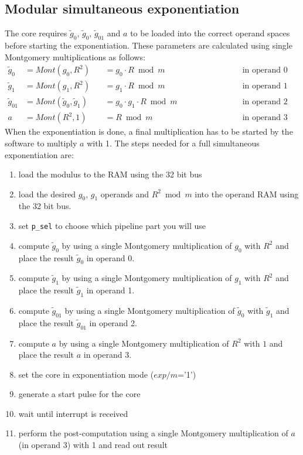 \subsection{Modular simultaneous exponentiation}
The core requires $\tilde{g}_{0}$, $\tilde{g}_{0}$, $\tilde{g}_{01}$ and $a$ to be loaded into the correct operand
spaces before starting the exponentiation. These parameters are calculated using single Montgomery multiplications as follows:
\begin{align*}
	\tilde{g}_{0} &= Mont(g_{0}, R^{2}) &\,&= g_{0} \cdot R \bmod m & \hspace{3cm}\text{in operand 0}\hspace{4cm}\\
	\tilde{g}_{1} &= Mont(g_{1}, R^{2}) &\,&= g_{1} \cdot R \bmod m & \hspace{3cm}\text{in operand 1}\hspace{4cm}\\
	\tilde{g}_{01} &= Mont(\tilde{g}_{0}, \tilde{g}_{1}) &\,&= g_{0} \cdot g_{1} \cdot R \bmod m & \hspace{3cm}\text{in operand 2}\hspace{4cm}\\
	a &= Mont(R^{2}, 1) &\,&= R \bmod m &\hspace{3cm}\text{in operand 3}\hspace{4cm}
\end{align*}
When the exponentiation is done, a final multiplication has to be started by the software to multiply $a$ with 1.
The steps needed for a full simultaneous exponentiation are:


\begin{enumerate}
  	\item load the modulus to the RAM using the 32 bit bus
	\item load the desired $g_0$, $g_1$ operands and \(R^{2} \bmod m\) into the operand RAM using the 32 bit bus.
	\item set \verb|p_sel| to choose which pipeline part you will use
	\item compute $\tilde{g}_{0}$ by using a single Montgomery multiplication of $g_{0}$ with $R^{2}$ and place the result $\tilde{g}_{0}$ in operand 0.
	\item compute $\tilde{g}_{1}$ by using a single Montgomery multiplication of $g_{1}$ with $R^{2}$ and place the result $\tilde{g}_{1}$ in operand 1.
	\item compute $\tilde{g}_{01}$ by using a single Montgomery multiplication of $\tilde{g}_{0}$ with $\tilde{g}_{1}$ and place the result $\tilde{g}_{01}$ in operand 2.
	\item compute $a$ by using a single Montgomery multiplication of $R^{2}$ with $1$ and place the result $a$ in operand 3.
	\item set the core in exponentiation mode ($exp/m$='1')
	\item generate a start pulse for the core
	\item wait until interrupt is received
	\item perform the post-computation using a single Montgomery multiplication of $a$(in operand 3) with 1 and read out result
\end{enumerate}